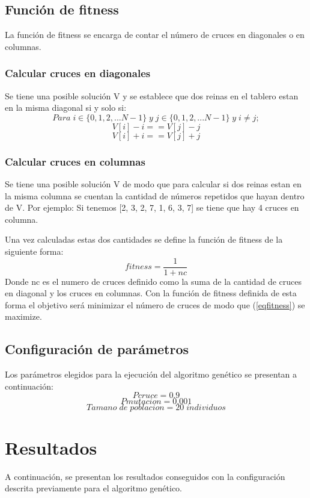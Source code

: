 \documentclass[11pt]{article}
\begin{document}
\subsection{Funci\'on de fitness}
La funci\'on de fitness se encarga de contar el n\'umero de
cruces en diagonales o en columnas.
\subsubsection{Calcular cruces en diagonales}
Se tiene una posible soluci\'on V y se establece que dos reinas en el tablero estan en la misma diagonal si y solo si:
\[Para\;i \in \{0, 1, 2, ... N-1\}\;y\;j \in \{0, 1, 2, ... N-1\}\;y\;i \neq j;\]
\[V[i] - i == V[j] - j\]
\[V[i] + i == V[j] + j\]
\subsubsection{Calcular cruces en columnas}
Se tiene una posible soluci\'on V de modo que para calcular si dos reinas estan en la
misma columna se cuentan la cantidad de n\'umeros repetidos que hayan dentro de V.
Por ejemplo: Si tenemos [2, 3, 2, 7, 1, 6, 3, 7] se tiene que hay 4 cruces en columna.

Una vez calculadas estas dos cantidades se define la funci\'on de fitness de la siguiente
forma:
\begin{equation}\label{eqfitness}
    fitness = \frac{1}{1+nc}
\end{equation}
Donde nc es el numero de cruces definido como la suma de la cantidad de cruces en diagonal
y los cruces en columnas.
Con la funci\'on de fitness definida de esta forma el objetivo ser\'a
minimizar el n\'umero de cruces de modo que (\ref{eqfitness}) se maximize.

\subsection{Configuraci\'on de par\'ametros}
Los par\'ametros elegidos para la ejecuci\'on del algoritmo gen\'etico se presentan a continuaci\'on:
\begin{equation}
Pcruce = 0.9
\end{equation}
\begin{equation}
Pmutacion = 0.001
\end{equation}
\begin{equation}
Tamano\;de\;poblacion = 20\;individuos
\end{equation}

\section{Resultados}
A continuaci\'on, se presentan los resultados conseguidos con la configuraci\'on
descrita previamente para el algoritmo gen\'etico.
\end{document}
